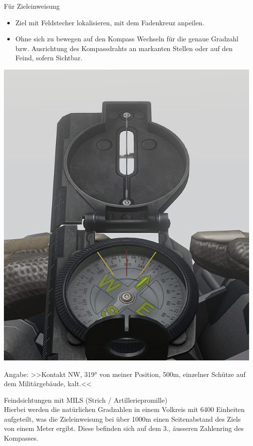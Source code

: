 	Für Zieleinweisung
		\begin{itemize}
 			\item Ziel mit Feldstecher lokalisieren, mit dem Fadenkreuz anpeilen.
			\item Ohne sich zu bewegen auf den Kompass Wechseln für die genaue Gradzahl bzw. Ausrichtung des Kompassdrahts an markanten Stellen oder auf den Feind, sofern Sichtbar.
		\end{itemize}

\begin{minipage}[t]{1\textwidth}
	\includegraphics[width=\textwidth]{./Grafiken/KarteUndMarkierungen/Kompass4.jpg}
\end{minipage}
	Angabe: >>Kontakt NW, 319° von meiner Position, 500m, einzelner Schütze auf dem Militärgebäude, kalt.<<

	Feindsichtungen mit MILS (Strich / Artilleriepromille) \\

	Hierbei werden die natürlichen Gradzahlen in einem Volkreis mit 6400 Einheiten aufgeteilt, was die Zieleinweisung bei über 1000m einen Seitenabstand des Ziels von einem Meter ergibt. Diese befinden sich auf dem 3., äusseren Zahlenring des Kompasses.  \\


